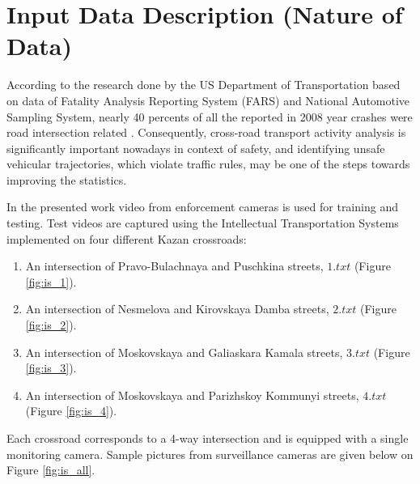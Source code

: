 \section{Input Data Description (Nature of Data)}

According to the research done by the US Department of Transportation based on data of Fatality Analysis Reporting System (FARS) and National Automotive Sampling System, nearly 40 percents of all the reported in 2008 year crashes were road intersection related \cite{inproceedings:10_cfi}. Consequently, cross-road transport activity analysis is significantly important nowadays in context of safety, and identifying unsafe vehicular trajectories, which violate traffic rules, may be one of the steps towards improving the statistics.

In the presented work video from enforcement cameras is used for training and testing. Test videos are captured using the Intellectual Transportation Systems implemented on four different Kazan crossroads:
\begin{enumerate}
	\item An intersection of Pravo-Bulachnaya and Puschkina streets, $1.txt$ (Figure \ref{fig:is_1}).
	\item An intersection of Nesmelova and Kirovskaya Damba streets, $2.txt$ (Figure \ref{fig:is_2}).
	\item An intersection of Moskovskaya and Galiaskara Kamala streets, $3.txt$ (Figure \ref{fig:is_3}).
	\item An intersection of Moskovskaya and Parizhskoy Kommunyi streets, $4.txt$ (Figure \ref{fig:is_4}).
\end{enumerate}

Each crossroad corresponds to a 4-way intersection and is equipped with a single monitoring camera. Sample pictures from surveillance cameras are given below on Figure \ref{fig:is_all}.

